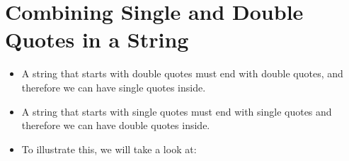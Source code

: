 \documentclass[letterpaper,10pt,english]{sphinxmanual}
\begin{document}
\section{Combining Single and Double Quotes in a String}
\label{\detokenize{lecture_notes/lec03_strings:combining-single-and-double-quotes-in-a-string}}\begin{itemize}
\item {} 
A string that starts with double quotes must end with double quotes,
and therefore we can have single quotes inside.

\item {} 
A string that starts with single quotes must end with single quotes
and therefore we can have double quotes inside.

\item {} 
To illustrate this, we will take a look at:

\begin{sphinxVerbatim}[commandchars=\\\{\}]
  
  
\end{sphinxVerbatim}

\end{itemize}
\end{document}
